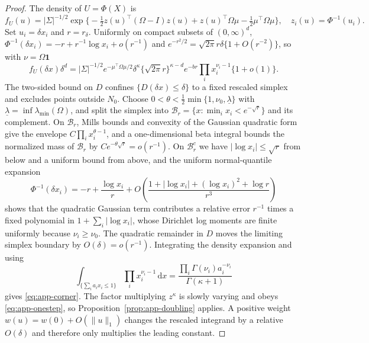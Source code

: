 \begin{proof}
The density of $U=\Phi(X)$ is
\[
 f_U(u)=|\Sigma|^{-1/2}
 \exp\bigl\{-\tfrac12z(u)^\top(\Omega-I)z(u)+z(u)^\top\Omega\mu
 -\tfrac12\mu^\top\Omega\mu\bigr\},
 \quad z_i(u)=\Phi^{-1}(u_i).
\]
Set $u_i=\delta x_i$ and $r=r_\delta$. Uniformly on compact subsets of
$(0,\infty)^d$,
$\Phi^{-1}(\delta x_i)=-r+r^{-1}\log x_i+o(r^{-1})$ and
$e^{-r^2/2}=\sqrt{2\pi}r\delta\{1+O(r^{-2})\}$, so with $\nu=\Omega\mathbf 1$
\[
 f_U(\delta x)\delta^d=|\Sigma|^{-1/2}e^{-\mu^\top\Omega\mu/2}
 \delta^{\kappa}\{\sqrt{2\pi}r\}^{\kappa-d}e^{-br}
 \prod_ix_i^{\nu_i-1}\{1+o(1)\}.
\]
The two-sided bound on $D$ confines $\{D(\delta x)\le\delta\}$ to a
fixed rescaled simplex and excludes points outside $N_0$. Choose
$0<\theta<\tfrac12\min\{1,\nu_0,\underline\lambda\}$ with
$\underline\lambda=\inf\lambda_{\min}(\Omega)$, and split the simplex into
$\mathcal B_r=\{x:\min_ix_i<e^{-\sqrt r}\}$ and its complement. On
$\mathcal B_r$, Mills bounds and convexity of the Gaussian quadratic form
give the envelope $C\prod_ix_i^{\theta-1}$, and a one-dimensional beta
integral bounds the normalized mass of $\mathcal B_r$ by
$Ce^{-\theta\sqrt r}=o(r^{-1})$. On $\mathcal B_r^c$ we have
$|\log x_i|\le\sqrt r$ from below and a uniform bound from above, and the
uniform normal-quantile expansion
\[
 \Phi^{-1}(\delta x_i)=-r+\frac{\log x_i}{r}
 +O\!\left(\frac{1+|\log x_i|+(\log x_i)^2+\log r}{r^3}\right)
\]
shows that the quadratic Gaussian term contributes a relative error
$r^{-1}$ times a fixed polynomial in $1+\sum_i|\log x_i|$, whose
Dirichlet log moments are finite uniformly because $\nu_i\ge\nu_0$. The
quadratic remainder in $D$ moves the limiting simplex boundary by
$O(\delta)=o(r^{-1})$. Integrating the density expansion and using
\[
 \int_{\{\sum_ia_ix_i\le1\}}\prod_ix_i^{\nu_i-1}\,\mathrm dx
 =\frac{\prod_i\Gamma(\nu_i)a_i^{-\nu_i}}{\Gamma(\kappa+1)}
\]
gives \eqref{eq:app-corner}. The factor multiplying $z^\kappa$ is
slowly varying and obeys \eqref{eq:app-onestep}, so
Proposition~\ref{prop:app-doubling} applies. A positive weight
$w(u)=w(0)+O(\|u\|_1)$ changes the rescaled integrand by a relative
$O(\delta)$ and therefore only multiplies the leading constant.
\end{proof}

